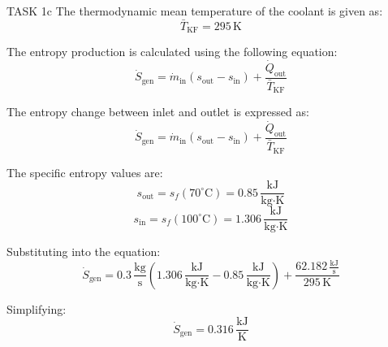 TASK 1c  
The thermodynamic mean temperature of the coolant is given as:  
\[
\bar{T}_{\text{KF}} = 295 \, \text{K}
\]

The entropy production is calculated using the following equation:  
\[
\dot{S}_{\text{gen}} = \dot{m}_{\text{in}} (s_{\text{out}} - s_{\text{in}}) + \frac{\dot{Q}_{\text{out}}}{\bar{T}_{\text{KF}}}
\]

The entropy change between inlet and outlet is expressed as:  
\[
\dot{S}_{\text{gen}} = \dot{m}_{\text{in}} (s_{\text{out}} - s_{\text{in}}) + \frac{\dot{Q}_{\text{out}}}{\bar{T}_{\text{KF}}}
\]

The specific entropy values are:  
\[
s_{\text{out}} = s_f (70^\circ\text{C}) = 0.85 \, \frac{\text{kJ}}{\text{kg·K}}
\]
\[
s_{\text{in}} = s_f (100^\circ\text{C}) = 1.306 \, \frac{\text{kJ}}{\text{kg·K}}
\]

Substituting into the equation:  
\[
\dot{S}_{\text{gen}} = 0.3 \, \frac{\text{kg}}{\text{s}} \left( 1.306 \, \frac{\text{kJ}}{\text{kg·K}} - 0.85 \, \frac{\text{kJ}}{\text{kg·K}} \right) + \frac{62.182 \, \frac{\text{kJ}}{\text{s}}}{295 \, \text{K}}
\]

Simplifying:  
\[
\dot{S}_{\text{gen}} = 0.316 \, \frac{\text{kJ}}{\text{K}}
\]